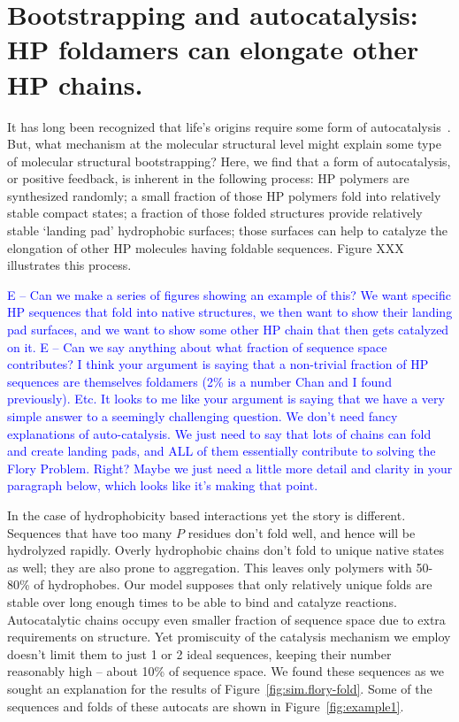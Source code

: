 \documentclass[journal=jacsat,manuscript=article,layout=twocolumn]{achemso}
\newcommand*{\blue}[1]{\textcolor{blue}{#1}}
\begin{document}
\section{Bootstrapping and autocatalysis: HP foldamers can elongate other HP chains.} 
\label{sec:evolution}
 It has long been recognized that life's origins 
 require some form of autocatalysis~\cite{Kauffman1986,Dyson1985,Eigen1978}.  But, what mechanism 
at the molecular structural level might explain some type of molecular structural bootstrapping?  
Here, we find that a form of autocatalysis, or positive feedback, is inherent in the following 
process:  HP polymers are synthesized randomly; a small fraction of those HP polymers fold into 
relatively stable compact states; a fraction of those folded structures provide relatively stable 
`landing pad' hydrophobic surfaces; those surfaces can help to catalyze the elongation of other HP 
molecules having foldable sequences.  Figure XXX illustrates this process.
 
 \blue{E -- Can we make a series of figures showing an example of this?  
 We want specific HP sequences that fold into native structures, we then want to show their landing 
pad surfaces, and we want to show some other HP chain that then gets catalyzed on it.}
 \blue{E -- Can we say anything about what fraction of sequence space contributes?  
 I think your argument is saying that a non-trivial fraction of HP sequences are themselves 
foldamers (2\% is a number Chan and I found previously).  Etc.  It looks to me like your argument is 
saying that we have a very simple answer to a seemingly challenging question.  We don't need fancy 
explanations of auto-catalysis.  We just need to say that lots of chains can fold and create landing 
pads, and ALL of them essentially contribute to solving the Flory Problem.  Right?  Maybe we just 
need a little more detail and clarity in your paragraph below, which looks like it's making that 
point.}
 
 
In the case of hydrophobicity based interactions yet the story is different. Sequences that have 
too many $P$ residues don't fold well, and hence will be hydrolyzed rapidly.  Overly hydrophobic 
chains don't fold to unique native states as well; they are also prone to aggregation. This leaves 
only polymers with 50-80\% of hydrophobes. 
Our model supposes that only relatively unique folds are stable over long enough times to be able 
to bind and catalyze reactions.  Autocatalytic chains occupy even smaller fraction of 
sequence space due to extra requirements on structure. Yet promiscuity of the catalysis mechanism 
we employ doesn't limit them to just 1 or 2 ideal sequences, keeping their number reasonably high 
-- about 10\% of sequence space.  We found these sequences as we sought an explanation for 
the results of Figure~\ref{fig:sim.flory-fold}.  Some of the sequences and folds of these autocats 
are shown in Figure~\ref{fig:example1}.
\end{document}

